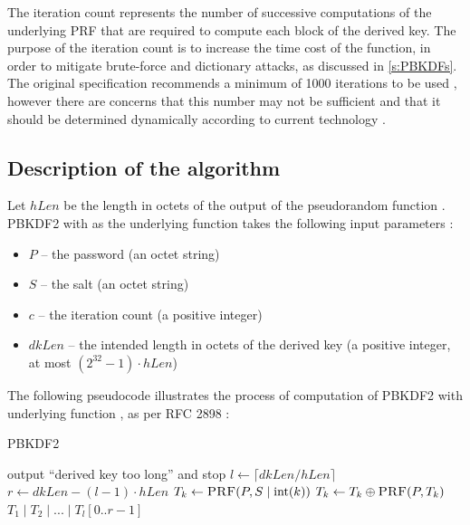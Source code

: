 \documentclass[12pt,oneside]{fithesis2}
\begin{document}
      The iteration count represents the number of successive computations of the underlying PRF that are required to compute each block of the derived key. The purpose of the iteration count is to increase the time cost of the function, in order to mitigate brute-force and dictionary attacks, as discussed in \ref{s:PBKDFs}. The original specification recommends a minimum of 1000 iterations to be used \cite[section 4.2]{rfc2898}, however there are concerns that this number may not be sufficient and that it should be determined dynamically according to current technology \cite[chapter 7]{Durmuth} \cite[footnotes 7, 8]{luks}.
      
      \subsection{Description of the algorithm}
      Let $hLen$ be the length in octets of the output of the pseudorandom function . PBKDF2 with  as the underlying function takes the following input parameters \cite{rfc2898}:
      \begin{itemize}
        \item $P$ -- the password (an octet string)
        \item $S$ -- the salt (an octet string)
        \item $c$ -- the iteration count (a positive integer)
        \item $dkLen$ -- the intended length in octets of the derived key (a positive integer, at most $(2^{32} - 1) \cdot hLen$)
      \end{itemize}
      
      The following pseudocode illustrates the process of computation of PBKDF2 with underlying function , as per RFC 2898 \cite{rfc2898}:
      \begin{algorithm}[H]
        \caption{PBKDF2}
        \begin{algorithmic}[1]
              \State output ``derived key too long'' and
         stop
            \EndIf
            \State $l \gets \lceil dkLen / hLen\rceil$ 
            \State $r \gets dkLen - (l - 1) \cdot hLen$ 
              \State $T_k \gets \Call{PRF}{P, S \mid \operatorname{int}(k)}$
                \State $T_k \gets T_k \oplus \Call{PRF}{P, T_k}$
              \EndFor
            \EndFor
            \State \Return $T_1 \mid T_2 \mid ... \mid T_l[0..r - 1]$
          \EndFunction
        \end{algorithmic}
      \end{algorithm}
      
\end{document}
